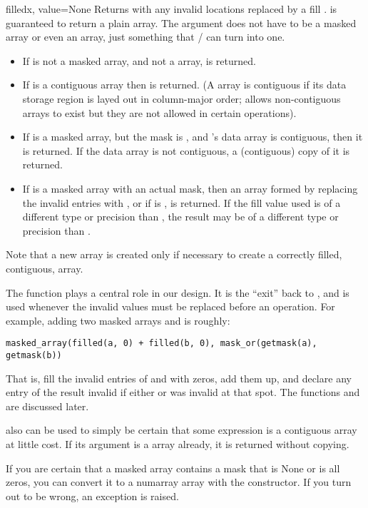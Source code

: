 \begin{funcdesc}{filled}{x, value=None}
   Returns  with any invalid locations replaced by a fill .
    is guaranteed to return a plain \module{\numarray} array.
   The argument  does not have to be a masked array or even an array,
   just something that \module{\numarray}/ can turn into
   one.
   \begin{itemize}
   \item If  is not a masked array, and not a \module{\numarray} array,
       is returned.
   \item If  is a contiguous \module{\numarray} array then  is
      returned. (A \module{\numarray} array is contiguous if its data storage
      region is layed out in column-major order; \module{\numarray} allows
      non-contiguous arrays to exist but they are not allowed in certain
      operations).
   \item If  is a masked array, but the mask is , and
      's data array is contiguous, then it is returned. If the data
      array is not contiguous, a (contiguous) copy of it is returned.
   \item If  is a masked array with an actual mask, then an array formed
      by replacing the invalid entries with , or
       if  is , is returned. If
      the fill value used is of a different type or precision than , the
      result may be of a different type or precision than .
\end{itemize}
Note that a new array is created only if necessary to create a correctly
filled, contiguous, \module{\numarray} array.

The function  plays a central role in our design. It is the
``exit'' back to \module{\numarray}, and is used whenever the invalid values
must be replaced before an operation. For example, adding two masked arrays
 and  is roughly:
\begin{verbatim}
masked_array(filled(a, 0) + filled(b, 0), mask_or(getmask(a), getmask(b))
\end{verbatim}
That is, fill the invalid entries of  and  with zeros, add them
up, and declare any entry of the result invalid if either  or 
was invalid at that spot. The functions  and
 are discussed later.

 also can be used to simply be certain that some expression is
a contiguous \module{\numarray} array at little cost. If its argument is a
\module{\numarray} array already, it is returned without copying.

If you are certain that a masked array  contains a mask that is None or
is all zeros, you can convert it to a numarray array with the
 constructor. If you turn out to be wrong, an
 exception is raised.
\end{funcdesc}


